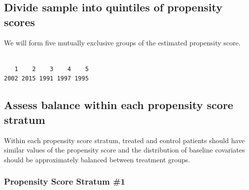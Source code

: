 \documentclass[
  letterpaper,
  DIV=11,
  numbers=noendperiod]{scrreprt}
\newenvironment{Shaded}{\begin{snugshade}}{\end{snugshade}}
\newcommand{\AttributeTok}[1]{\textcolor[rgb]{0.40,0.45,0.13}{#1}}
\newcommand{\CommentTok}[1]{\textcolor[rgb]{0.37,0.37,0.37}{#1}}
\newcommand{\ConstantTok}[1]{\textcolor[rgb]{0.56,0.35,0.01}{#1}}
\newcommand{\DecValTok}[1]{\textcolor[rgb]{0.68,0.00,0.00}{#1}}
\newcommand{\FloatTok}[1]{\textcolor[rgb]{0.68,0.00,0.00}{#1}}
\newcommand{\FunctionTok}[1]{\textcolor[rgb]{0.28,0.35,0.67}{#1}}
\newcommand{\NormalTok}[1]{\textcolor[rgb]{0.00,0.23,0.31}{#1}}
\newcommand{\OtherTok}[1]{\textcolor[rgb]{0.00,0.23,0.31}{#1}}
\newcommand{\SpecialCharTok}[1]{\textcolor[rgb]{0.37,0.37,0.37}{#1}}
\begin{document}
\hypertarget{divide-sample-into-quintiles-of-propensity-scores}{%
\subsection{Divide sample into quintiles of propensity
scores}\label{divide-sample-into-quintiles-of-propensity-scores}}

We will form five mutually exclusive groups of the estimated propensity
score.

\begin{Shaded}
\end{Shaded}

\begin{verbatim}

   1    2    3    4    5 
2002 2015 1991 1997 1995 
\end{verbatim}

\hypertarget{assess-balance-within-each-propensity-score-stratum}{%
\subsection{Assess balance within each propensity score
stratum}\label{assess-balance-within-each-propensity-score-stratum}}

Within each propensity score stratum, treated and control patients
should have similar values of the propensity score and the distribution
of baseline covariates should be approximately balanced between
treatment groups.

\hypertarget{propensity-score-stratum-1}{%
\subsubsection{Propensity Score Stratum
\#1}\label{propensity-score-stratum-1}}
\end{document}
